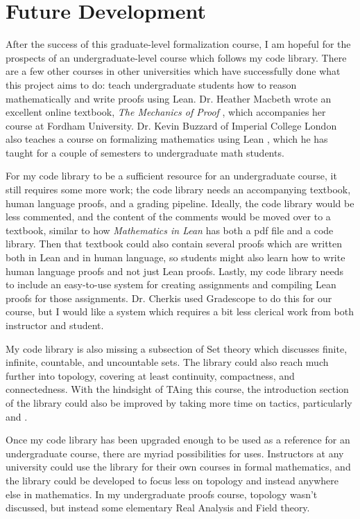 \section{Future Development}

After the success of this graduate-level formalization course, I am
hopeful for the prospects of an undergraduate-level course which
follows my code library. There are a few other courses in other
universities which have successfully done what this project aims to do:
teach undergraduate students how to reason mathematically and write proofs
using Lean. Dr. Heather Macbeth wrote an excellent online textbook, 
\textit{The Mechanics of Proof} \cite{Macbeth}, 
which accompanies her course at Fordham University. 
Dr. Kevin Buzzard of Imperial College London also teaches a course on 
formalizing mathematics using Lean \cite{Buzzard}, 
which he has taught for a couple of 
semesters to undergraduate math students. 

For my code library to be a sufficient resource for an undergraduate course, 
it still requires some more work; the code library needs an accompanying 
textbook, human language proofs, and a grading pipeline. Ideally, the code
library would be less commented, and the content of the comments would be moved
over to a textbook, similar to how \textit{Mathematics in Lean} has both a pdf file
and a code library. Then that textbook could also contain several proofs which
are written both in Lean and in human language, so students might also
learn how to write human language proofs and not just Lean proofs. Lastly, 
my code library needs to include an easy-to-use system for creating assignments
and compiling Lean proofs for those assignments. Dr. Cherkis used Gradescope to
do this for our course, but I would like a system which requires a bit less clerical
work from both instructor and student.

My code library is also missing a subsection of Set theory which discusses
finite, infinite, countable, and uncountable sets. The library could also
reach much further into topology, covering at least continuity, compactness, and
connectedness. With the hindsight of TAing this course, the introduction section 
of the library could also be improved by taking more time on tactics, 
particularly  and .

Once my code library has been upgraded enough to be used as a reference for
an undergraduate course, there are myriad possibilities for uses.
Instructors at any university could use the library for their own courses
in formal mathematics, and the library could be developed to focus less on
topology and instead anywhere else in mathematics. In my undergraduate proofs
course, topology wasn't discussed, but instead some elementary Real Analysis and
Field theory. 

